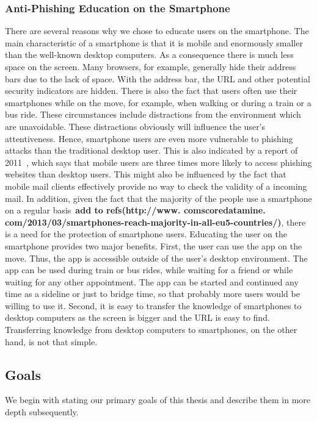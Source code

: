 \subsubsection{Anti-Phishing Education on the Smartphone}
\label{s:antiphishing_on_smartphone}
There are several reasons why we chose to educate users on the smartphone.
 The main characteristic of a smartphone is that it is mobile and enormously smaller than the well-known desktop computers.
 As a consequence there is much less space on the screen.
 Many browsers, for example, generally hide their address bars due to the lack of space.
 With the address bar, the URL and other potential security indicators are hidden.
 There is also the fact that users often use their smartphones while on the move, for example, when walking or  during a train or a bus ride.
 These circumstances include distractions from the environment which are unavoidable.
 These distractions obviously will influence the user's attentiveness.
 Hence, smartphone users are even more vulnerable to phishing attacks than the traditional desktop user.
 This is also indicated by a report of 2011~\cite{trusteer2011}, which says that mobile users are three times more likely to access phishing websites than desktop users.
 This might also be influenced by the fact that mobile mail clients effectively provide no way to check the validity of a incoming mail.
 In addition, given the fact that the majority of the people use a smartphone on a regular basis~\textbf{add to refs(http://www.
comscoredatamine.
com/2013/03/smartphones-reach-majority-in-all-eu5-countries/)}, there is a need for the protection of smartphone users.
 Educating the user on the smartphone provides two major benefits.
 First, the user can use the app on the move.
 Thus, the app is accessible outside of the user's desktop environment.
 The app can be used during train or bus rides, while waiting for a friend or while waiting for any other appointment.
 The app can be started and continued any time as a sideline or just to bridge time, so that probably more users would be willing to use it.
 Second, it is easy to transfer the knowledge of smartphones to desktop computers as the screen is bigger and the URL is easy to find.
 Transferring knowledge from desktop computers to smartphones, on the other hand, is not that simple.


\subsection{Goals}
\label{s:goals}
We begin with stating our primary goals of this thesis and describe them in more depth subsequently.


